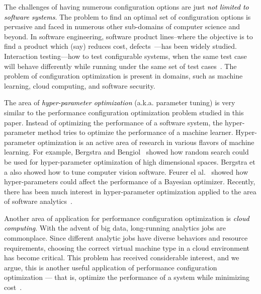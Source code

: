  
 
The challenges of having numerous configuration options are just \textcolor{black}{{\em not limited to software systems}}. The problem to find an optimal set of configuration options is pervasive and faced in numerous other sub-domains of computer science and beyond. In software engineering, software product lines--where the objective is to find a product which (say) reduces cost, defects~\cite{chen2016sampling, henard2015combining}---has been widely studied.  
Interaction testing---how to test configurable systems, when the same test case will behave differently while running under the same set of test cases~\cite{cohen2006testing, qu2007combinatorial, jin2014configurations, medeiros2016comparison}. 
The problem of configuration optimization is present in domains, such as machine learning, cloud computing, and software security.


The area of \textcolor{black}{{\em hyper-parameter optimization}} (a.k.a.  parameter tuning) is very similar to the performance configuration optimization problem studied in this paper. Instead of optimizing the performance of a software system, the hyper-parameter method tries to optimize the performance of a machine learner. Hyper-parameter optimization is an active area of research in various flavors of machine learning. For example, Bergstra and Bengiol~\cite{bergstra2013making} showed how random search could be used for hyper-parameter optimization of high dimensional spaces.
Bergstra et a also showed how to tune computer vision software.
Feurer el al.~\cite{feurer2015initializing} showed how hyper-parameters could affect the performance of a Bayesian optimizer. 
Recently, there has been much interest in 
hyper-parameter optimization applied to the area of software analytics~\cite{fu2016tuning, fufse17, fu2016differential, tantithamthavorn2016automated, agrawal2016wrong}.

Another area of application for performance configuration optimization is \textcolor{black}{{\em cloud computing}}.  
With the advent of big data, long-running analytics jobs are commonplace. Since different analytic jobs have diverse behaviors and resource requirements, choosing the correct virtual machine type
in a  cloud environment has become critical. This problem has received considerable interest, and we argue, this is another useful application of performance configuration optimization --- that is, optimize the performance of a system while minimizing cost~\cite{alipourfard2017cherrypick, venkataraman2016ernest, yadwadkar2017selecting, Zhu:2017:BTP:3127479.3128605, dalibard2017boat}. 


